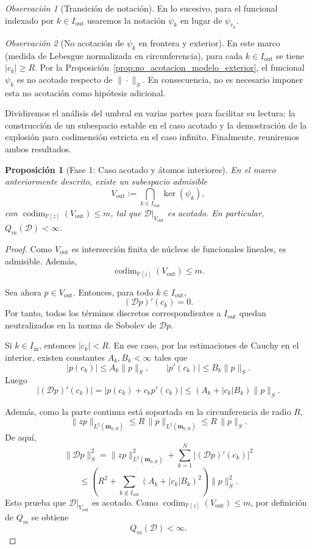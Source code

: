 \documentclass[12pt,a4paper]{article}
\newtheorem{proposition}{Proposición}
\theoremstyle{definition}
\theoremstyle{remark}
\newtheorem{remark}{Observación}
\newcommand{\Poly}{\mathbb{P}[z]}
\newcommand{\D}{\mathcal{D}}
\begin{document}
\begin{remark}[Transición de notación]
  En lo sucesivo, para el funcional indexado por $k \in I_{\mathrm{out}}$ usaremos la notación $\psi_k$ en lugar de $\psi_{c_k}$.
\end{remark}

\begin{remark}[No acotación de $\psi_k$ en frontera y exterior]
  En este marco (medida de Lebesgue normalizada en circunferencia), para cada $k\in I_{\mathrm{out}}$ se tiene $|c_k|\ge R$. Por la Proposición~\ref{prop:no_acotacion_modelo_exterior}, el funcional $\psi_k$ es no acotado respecto de $\|\cdot\|_S$. En consecuencia, no es necesario imponer esta no acotación como hipótesis adicional.
\end{remark}

Dividiremos el análisis del umbral en varias partes para facilitar su lectura: la construcción de un subespacio estable en el caso acotado y la demostración de la explosión para codimensión estricta en el caso infinito. Finalmente, reuniremos ambos resultados.

\begin{proposition}[Fase 1: Caso acotado y átomos interiores]\label{prop:umbral_fase1}
  En el marco anteriormente descrito, existe un subespacio admisible
  \[
    V_{\mathrm{out}}:=\bigcap_{k\in I_{\mathrm{out}}}\ker(\psi_k),
  \]
  con $\operatorname{codim}_{\Poly}(V_{\mathrm{out}})\le m$, tal que $\D|_{V_{\mathrm{out}}}$ es acotado. En particular, $Q_m(\D)<\infty$.
\end{proposition}

\begin{proof}
  Como $V_{\mathrm{out}}$ es intersección finita de núcleos de funcionales lineales, es admisible.
  Además,
  \[
    \operatorname{codim}_{\Poly}(V_{\mathrm{out}})\le m.
  \]

  Sea ahora $p\in V_{\mathrm{out}}$. Entonces, para todo $k\in I_{\mathrm{out}}$,
  \[
    (\D p)'(c_k)=0.
  \]
  Por tanto, todos los términos discretos correspondientes a $I_{\mathrm{out}}$ quedan
  neutralizados en la norma de Sobolev de $\D p$.

  Si $k\in I_{\mathrm{in}}$, entonces $|c_k|<R$. En ese caso, por las estimaciones
  de Cauchy en el interior, existen constantes $A_k,B_k<\infty$ tales que
  \[
    |p(c_k)|\le A_k\|p\|_S,
    \qquad
    |p'(c_k)|\le B_k\|p\|_S.
  \]
  Luego
  \[
    |(\D p)'(c_k)|
    =
    |p(c_k)+c_kp'(c_k)|
    \le
    (A_k+|c_k|B_k)\|p\|_S.
  \]

  Además, como la parte continua está soportada en la circunferencia de radio $R$,
  \[
    \|zp\|_{L^2(\mathbf{m}_{0;R})}\le R\,\|p\|_{L^2(\mathbf{m}_{0;R})}\le R\,\|p\|_S.
  \]
  De aquí,
  \[
    \|\D p\|_S^2
    =
    \|zp\|_{L^2(\mathbf{m}_{0;R})}^2
    +
    \sum_{k=1}^N |(\D p)'(c_k)|^2
  \]
  \[
    \le
    \left(
    R^2+\sum_{k\notin I_{\mathrm{out}}}(A_k+|c_k|B_k)^2
    \right)\|p\|_S^2.
  \]
  Esto prueba que $\D|_{V_{\mathrm{out}}}$ es acotado. Como
  $\operatorname{codim}_{\Poly}(V_{\mathrm{out}})\le m$, por definición de $Q_m$ se obtiene
  \[
    Q_m(\D)<\infty.
  \]
\end{proof}
\end{document}
